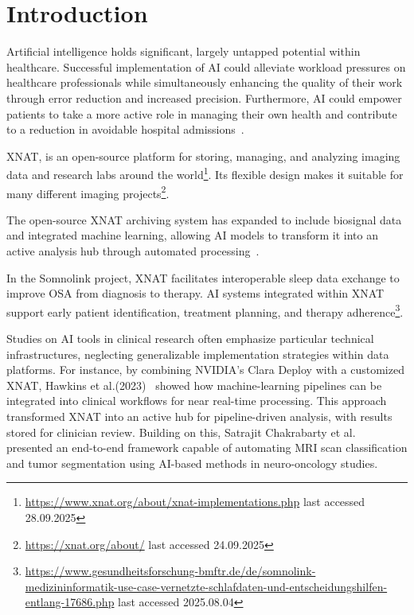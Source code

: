 

\chapter{Introduction}

Artificial intelligence holds significant, largely untapped potential within healthcare. Successful implementation of \ac{AI} could alleviate workload pressures on healthcare professionals while simultaneously enhancing the quality of their work through error reduction and increased precision. Furthermore, AI could empower patients to take a more active role in managing their own health and contribute to a reduction in avoidable hospital admissions~\cite{aung_promise_2021}.


XNAT, is an open-source platform for storing, managing, and analyzing imaging data and research labs around the world\footnote{\url{https://www.xnat.org/about/xnat-implementations.php}{ last accessed 28.09.2025}}. Its flexible design makes it suitable for many different imaging projects\footnote{\url{https://xnat.org/about/} last accessed 24.09.2025}.


The open-source XNAT archiving system has expanded to include biosignal data and integrated machine learning, allowing AI models to transform it into an active analysis hub through automated processing~\cite{marcus_extensible_2007}.

In the Somnolink project, XNAT facilitates interoperable sleep data exchange to improve \ac{OSA} from diagnosis to therapy. AI systems integrated within XNAT support early patient identification, treatment planning, and therapy  adherence\footnote{\url{https://www.gesundheitsforschung-bmftr.de/de/somnolink-medizininformatik-use-case-vernetzte-schlafdaten-und-entscheidungshilfen-entlang-17686.php}{ last accessed 2025.08.04}}.

Studies on AI tools in clinical research often emphasize particular technical infrastructures, neglecting generalizable implementation strategies within data platforms. For instance, by combining NVIDIA’s Clara Deploy with a customized XNAT, Hawkins et al.(2023)~\cite{hawkins_implementation_2023} showed how machine-learning pipelines can be integrated into clinical workflows for near real-time processing. This approach transformed XNAT into an active hub for pipeline-driven analysis, with results stored for clinician review. Building on this, Satrajit Chakrabarty et al.~\cite{chakrabarty_deep_2023} presented an end-to-end framework capable of automating \ac{MRI} scan classification and tumor segmentation using AI-based methods in neuro-oncology studies.

